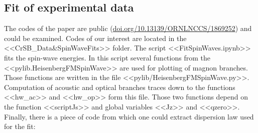 \documentclass[a4paper,12pt]{article}
\begin{document}
        \subsection{Fit of experimental data}
            The codes of the paper are public (\url{doi.org/10.13139/ORNLNCCS/1869252}) and could be examined. 
            Codes of our interest are located in the <<CrSB\_Data\&SpinWaveFits>> folder.
            The script <<FitSpinWaves.ipynb>> fits the spin-wave energies. 
            In this script several functions from the <<pylib.HeisenbergFMSpinWave>> are used for plotting of magnon branches. 
            Those functions are written in the file <<pylib/HeisenbergFMSpinWave.py>>.
            Computation of acoustic and optical branches traces down to the functions <<hw\_ac>> and <<hw\_op>> form this file.
            Those two functions depend on the function <<scriptJs>> and global variables <<Jz>> and <<qzero>>. 
            Finally, there is a piece of code from which one could extract dispersion law used for the fit:
\end{document}
